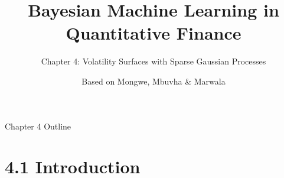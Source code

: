 \documentclass[aspectratio=169,10pt]{beamer}
\title[Bayesian ML in QF -- Ch.4]{Bayesian Machine Learning in Quantitative Finance}
\subtitle{Chapter 4: Volatility Surfaces with Sparse Gaussian Processes}
\author{Based on Mongwe, Mbuvha \& Marwala}
\date{}
\begin{document}
\begin{frame}
  \titlepage
\end{frame}

\begin{frame}{Chapter 4 Outline}
  \tableofcontents
\end{frame}

\section{4.1 Introduction}
\end{document}
